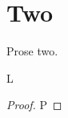 \section{Two}\label{ed-0102}
Prose two.
\begin{lemma}\label{ed-0001}
L
\end{lemma}
\begin{proof}
P
\end{proof}
